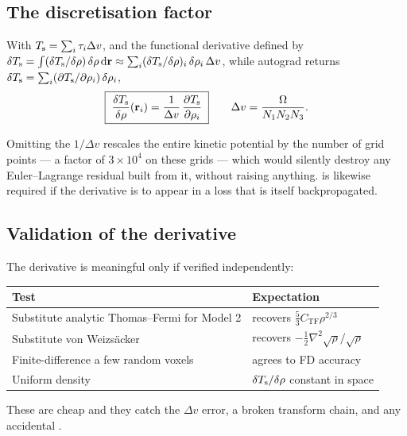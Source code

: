 \subsection{The discretisation factor}

With $T_{\mathrm{s}} = \sum_i \tau_i \Delta v$, and the functional derivative defined by
$\delta T_{\mathrm{s}} = \int (\delta T_{\mathrm{s}}/\delta\rho)\,\delta\rho\,\mathrm{d}\mathbf{r}
\approx \sum_i (\delta T_{\mathrm{s}}/\delta\rho)_i\,\delta\rho_i\,\Delta v$, while
autograd returns $\delta T_{\mathrm{s}} = \sum_i (\partial T_{\mathrm{s}}/\partial\rho_i)\,\delta\rho_i$,
\begin{equation}
  \boxed{\;
    \frac{\delta T_{\mathrm{s}}}{\delta\rho}(\mathbf{r}_i)
      = \frac{1}{\Delta v}\,\frac{\partial T_{\mathrm{s}}}{\partial \rho_i} \;}
  \qquad \Delta v = \frac{\Omega}{N_1N_2N_3} .
\end{equation}

\begin{pwarn}
Omitting the $1/\Delta v$ rescales the entire kinetic potential by the number of
grid points --- a factor of $3\times10^{4}$ on these grids --- which would
silently destroy any Euler--Lagrange residual built from it, without raising
anything.  is likewise required if the derivative is to
appear in a loss that is itself backpropagated.
\end{pwarn}

\subsection{Validation of the derivative}

The derivative is meaningful only if verified independently:

\begin{center}
\begin{tabular}{@{}ll@{}}
\toprule
Test & Expectation \\
\midrule
Substitute analytic Thomas--Fermi for Model 2
  & recovers $\tfrac{5}{3}C_{\mathrm{TF}}\rho^{2/3}$ \\
Substitute von Weizsäcker
  & recovers $-\tfrac12\nabla^2\sqrt\rho/\sqrt\rho$ \\
Finite-difference a few random voxels & agrees to FD accuracy \\
Uniform density & $\delta T_{\mathrm{s}}/\delta\rho$ constant in space \\
\bottomrule
\end{tabular}
\end{center}

These are cheap and they catch the $\Delta v$ error, a broken transform chain,
and any accidental .

